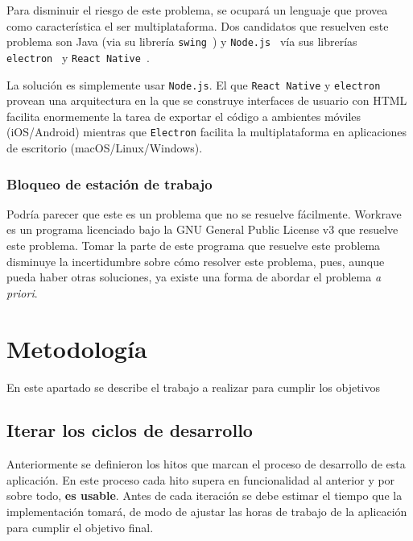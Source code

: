 \documentclass[12pt,letterpaper]{report}
\begin{document}
Para disminuir el riesgo de este problema, se ocupará un lenguaje que provea como característica el ser multiplataforma.
Dos candidatos que resuelven este problema son Java (via su librería \texttt{swing}~\cite{javaswing}) y
\texttt{Node.js}~\cite{nodejs} vía sus librerías \texttt{electron}~\cite{electron} y \texttt{React\
Native}~\cite{react-native}.

La solución es simplemente usar \texttt{Node.js}. El que \texttt{React Native} y \texttt{electron} provean una
arquitectura en la que se construye interfaces de usuario con HTML facilita enormemente la tarea de exportar el código a
ambientes móviles (iOS/Android) mientras que \texttt{Electron} facilita la multiplataforma en aplicaciones de escritorio
(macOS/Linux/Windows).

\subsubsection{Bloqueo de estación de trabajo}\label{bloqueo-de-estacion-de-trabajo}

Podría parecer que este es un problema que no se resuelve fácilmente. Workrave~\cite{workrave} es un programa licenciado
bajo la GNU General Public License v3 que resuelve este problema. Tomar la parte de este programa que resuelve este
problema disminuye la incertidumbre sobre cómo resolver este problema, pues, aunque pueda haber otras soluciones, ya
existe una forma de abordar el problema \emph{a priori}.

\newpage
\section{Metodología}\label{metodologuxeda}

En este apartado se describe el trabajo a realizar para cumplir los
objetivos

\subsection{Iterar los ciclos de desarrollo}\label{iterar-los-ciclos-de-desarrollo}

Anteriormente se definieron los hitos que marcan el proceso de desarrollo de esta aplicación. En este proceso cada hito
supera en funcionalidad al anterior y por sobre todo, \textbf{es usable}. Antes de cada iteración se debe estimar el
tiempo que la implementación tomará, de modo de ajustar las horas de trabajo de la aplicación para cumplir el objetivo
final.
\end{document}
